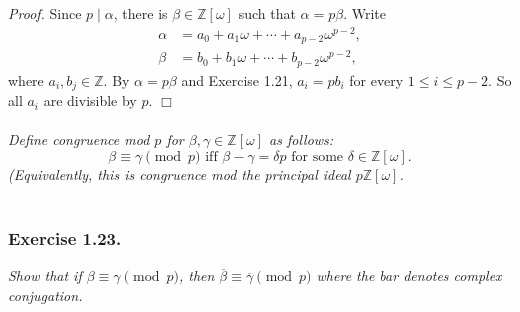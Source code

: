 \documentclass{article}
\begin{document}
\emph{Proof.}
Since $p \mid \alpha$, there is $\beta \in \mathbb{Z}[\omega]$
such that $\alpha = p\beta$.
Write
\begin{align*}
\alpha &= a_0 + a_1 \omega + \cdots + a_{p-2} \omega^{p-2}, \\
\beta &= b_0 + b_1 \omega + \cdots + b_{p-2} \omega^{p-2},
\end{align*}
where $a_i, b_j \in \mathbb{Z}$.
By $\alpha = p\beta$ and Exercise 1.21, $a_i = pb_i$ for every $1 \leq i \leq p-2$.
So all $a_i$ are divisible by $p$.
$\Box$ \\\\






\emph{Define congruence mod $p$ for $\beta, \gamma \in \mathbb{Z}[\omega]$
as follows:
$$\beta \equiv \gamma \pmod{p}
\text{ iff }
\beta - \gamma = \delta p \text{ for some } \delta \in \mathbb{Z}[\omega].$$
(Equivalently, this is congruence mod the principal ideal $p\mathbb{Z}[\omega]$.} \\\\



\subsubsection*{Exercise 1.23.}
\emph{Show that if $\beta \equiv \gamma \pmod{p}$,
then $\overline{\beta} \equiv \overline{\gamma} \pmod{p}$
where the bar denotes complex conjugation. } \\
\end{document}
